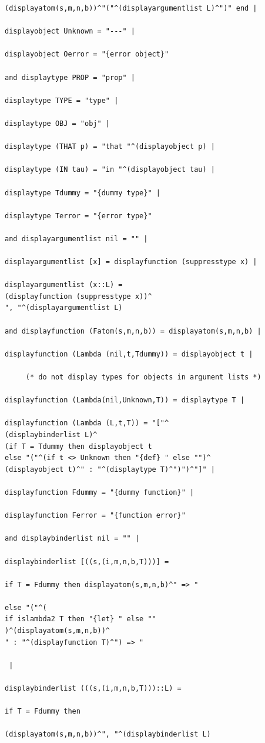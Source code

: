 \documentclass[12pt]{article}
\begin{document}
\begin{verbatim}
(displayatom(s,m,n,b))^"("^(displayargumentlist L)^")" end |

displayobject Unknown = "---" |

displayobject Oerror = "{error object}"

and displaytype PROP = "prop" |

displaytype TYPE = "type" |

displaytype OBJ = "obj" |

displaytype (THAT p) = "that "^(displayobject p) |

displaytype (IN tau) = "in "^(displayobject tau) |

displaytype Tdummy = "{dummy type}" |

displaytype Terror = "{error type}"

and displayargumentlist nil = "" |

displayargumentlist [x] = displayfunction (suppresstype x) |

displayargumentlist (x::L) = 
(displayfunction (suppresstype x))^
", "^(displayargumentlist L) 

and displayfunction (Fatom(s,m,n,b)) = displayatom(s,m,n,b) |

displayfunction (Lambda (nil,t,Tdummy)) = displayobject t |

     (* do not display types for objects in argument lists *)
	 
displayfunction (Lambda(nil,Unknown,T)) = displaytype T |
	 
displayfunction (Lambda (L,t,T)) = "["^
(displaybinderlist L)^
(if T = Tdummy then displayobject t
else "("^(if t <> Unknown then "{def} " else "")^
(displayobject t)^" : "^(displaytype T)^")")^"]" |

displayfunction Fdummy = "{dummy function}" |

displayfunction Ferror = "{function error}"

and displaybinderlist nil = "" |

displaybinderlist [((s,(i,m,n,b,T)))] = 

if T = Fdummy then displayatom(s,m,n,b)^" => "

else "("^(
if islambda2 T then "{let} " else ""
)^(displayatom(s,m,n,b))^
" : "^(displayfunction T)^") => "

 |

displaybinderlist (((s,(i,m,n,b,T)))::L) = 

if T = Fdummy then

(displayatom(s,m,n,b))^", "^(displaybinderlist L)


\end{verbatim}
\end{document}
